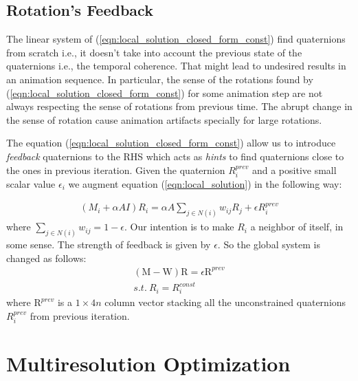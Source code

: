 \documentclass{birkjour}
\numberwithin{equation}{section}
\begin{document}
 \subsection{Rotation's Feedback}
 
The linear system of (\ref{eqn:local_solution_closed_form_const}) find quaternions from scratch i.e., it doesn't take into account the previous state of the quaternions i.e., the temporal coherence. That might lead to undesired results in an animation sequence. In particular, the sense of the rotations found by (\ref{eqn:local_solution_closed_form_const}) for some animation step are not always respecting the sense of rotations from previous time. The abrupt change in the sense of rotation cause animation artifacts specially for large rotations.

The equation (\ref{eqn:local_solution_closed_form_const}) allow us to introduce \emph{feedback} quaternions to the RHS which acts as \emph{hints} to find quaternions close to the ones in previous iteration. Given the quaternion $R^{prev}_i$ and a positive small scalar value $\epsilon_i$ we augment equation (\ref{eqn:local_solution}) in the following way:

\begin{eqnarray}
	\label{eqn:local_solution_feedback}
	(M_i + \alpha A I)R_i  = \alpha A \sum_{j \in N(i)} {w_{ij} R_j} + \epsilon R^{prev}_i
\end{eqnarray}
where  $\sum_{j \in N(i)} {w_{ij}} = 1-\epsilon$. Our intention is to make $R_i$ a neighbor of itself, in some sense. The strength of feedback is given by $\epsilon$. So the global system is changed as follows: 
\begin{eqnarray}	\label{eqn:local_solution_closed_form_const_feedback}
	(\mathrm M - \mathrm W) \mathrm R = \epsilon \mathrm R^{prev}\\
	s.t. \ R_i = R^{const}_i \nonumber
\end{eqnarray}
where $\mathrm R^{prev}$ is a $1\times4n$ column vector stacking all the unconstrained quaternions $R^{prev}_i$ from previous iteration.

\section{Multiresolution Optimization}
\end{document}
